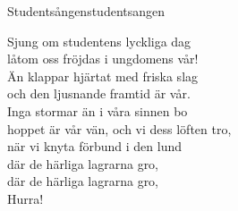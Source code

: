 \begin{song}{Studentsången}{studentsangen}

\begin{vers}
Sjung om studentens lyckliga dag\\
låtom oss fröjdas i ungdomens vår!\\
Än klappar hjärtat med friska slag\\
och den ljusnande framtid är vår.\\
Inga stormar än i våra sinnen bo\\
hoppet är vår vän, och vi dess löften tro,\\
när vi knyta förbund i den lund\\
där de härliga lagrarna gro,\\
där de härliga lagrarna gro,\\
Hurra!\\
\end{vers}
\end{song}
